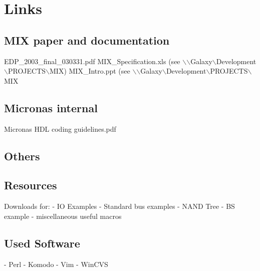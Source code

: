 \documentclass[a4paper,12pt]{article}
\begin{document}
\section{Links}

\subsection{MIX paper and documentation}
EDP\_2003\_final\_030331.pdf\newline
MIX\_Specification.xls (see $\backslash$$\backslash$Galaxy$\backslash$Development$\backslash$PROJECTS$\backslash$MIX)\newline
MIX\_Intro.ppt (see $\backslash$$\backslash$Galaxy$\backslash$Development$\backslash$PROJECTS$\backslash$MIX\newline

\subsection{Micronas internal}
Micronas HDL coding guidelines.pdf

\subsection{Others}

\subsection{Resources}
\hspace*{10mm}Downloads for:\newline
\hspace*{20mm}- IO Examples\newline
\hspace*{20mm}- Standard bus examples\newline
\hspace*{20mm}- NAND Tree\newline
\hspace*{20mm}- BS example\newline
\hspace*{20mm}- miscellaneous useful macros\newline

\subsection{Used Software}
\hspace*{15mm}- Perl\newline
\hspace*{15mm}- Komodo\newline
\hspace*{15mm}- Vim\newline
\hspace*{15mm}- WinCVS\newline
\end{document}
